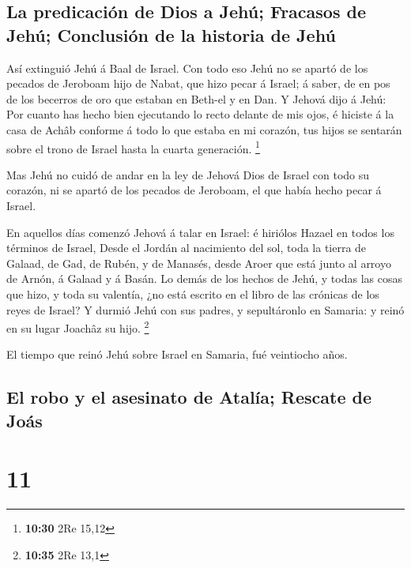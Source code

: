 \hypertarget{la-predicaciuxf3n-de-dios-a-jehuxfa-fracasos-de-jehuxfa-conclusiuxf3n-de-la-historia-de-jehuxfa}{%
\subsection{La predicación de Dios a Jehú; Fracasos de Jehú; Conclusión
de la historia de
Jehú}\label{la-predicaciuxf3n-de-dios-a-jehuxfa-fracasos-de-jehuxfa-conclusiuxf3n-de-la-historia-de-jehuxfa}}

 Así extinguió Jehú á Baal de Israel.  Con
todo eso Jehú no se apartó de los pecados de Jeroboam hijo de Nabat, que
hizo pecar á Israel; á saber, de en pos de los becerros de oro que
estaban en Beth-el y en Dan.  Y Jehová dijo á Jehú: Por
cuanto has hecho bien ejecutando lo recto delante de mis ojos, é hiciste
á la casa de Achâb conforme á todo lo que estaba en mi corazón, tus
hijos se sentarán sobre el trono de Israel hasta la cuarta generación.
\footnote{\textbf{10:30} 2Re 15,12}

 Mas Jehú no cuidó de andar en la ley de Jehová Dios de
Israel con todo su corazón, ni se apartó de los pecados de Jeroboam, el
que había hecho pecar á Israel.

 En aquellos días comenzó Jehová á talar en Israel: é
hiriólos Hazael en todos los términos de Israel,  Desde el
Jordán al nacimiento del sol, toda la tierra de Galaad, de Gad, de
Rubén, y de Manasés, desde Aroer que está junto al arroyo de Arnón, á
Galaad y á Basán.  Lo demás de los hechos de Jehú, y todas
las cosas que hizo, y toda su valentía, ¿no está escrito en el libro de
las crónicas de los reyes de Israel?  Y durmió Jehú con sus
padres, y sepultáronlo en Samaria: y reinó en su lugar Joachâz su hijo.
\footnote{\textbf{10:35} 2Re 13,1}

 El tiempo que reinó Jehú sobre Israel en Samaria, fué
veintiocho años.

\hypertarget{el-robo-y-el-asesinato-de-ataluxeda-rescate-de-jouxe1s}{%
\subsection{El robo y el asesinato de Atalía; Rescate de
Joás}\label{el-robo-y-el-asesinato-de-ataluxeda-rescate-de-jouxe1s}}

\hypertarget{section-10}{%
\section{11}\label{section-10}}

